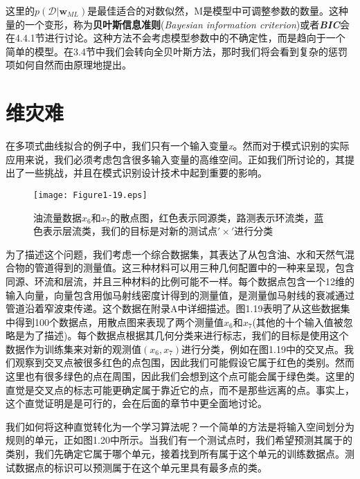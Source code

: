 	这里的$p(\mathcal{D}| \textbf{w}_{ML})$是最佳适合的对数似然，M是模型中可调整参数的数量。这种量的一个变形，称为\textbf{贝叶斯信息准则}(\textit{Bayesian information criterion})或者\textit{\textbf{BIC}}会在4.4.1节进行讨论。这种方法不会考虑模型参数中的不确定性，而是趋向于一个简单的模型。在3.4节中我们会转向全贝叶斯方法，那时我们将会看到复杂的惩罚项如何自然而由原理地提出。
	
\section{维灾难}
	在多项式曲线拟合的例子中，我们只有一个输入变量\textit{x}。然而对于模式识别的实际应用来说，我们必须考虑包含很多输入变量的高维空间。正如我们所讨论的，其提出了一些挑战，并且在模式识别设计技术中起到重要的影响。
	
	\begin{figure}[t]
		\parbox{.4\textwidth}{\caption{ 油流量数据$x_6$和$x_7$的散点图，红色表示同源类，路测表示环流类，蓝色表示层流类，我们的目标是对新的测试点$'\times'$进行分类 }}
		\parbox{.5\textwidth}{\texttt{[image: Figure1-19.eps]}}
	\end{figure}
	
	为了描述这个问题，我们考虑一个综合数据集，其表达了从包含油、水和天然气混合物的管道得到的测量值。这三种材料可以用三种几何配置中的一种来呈现，包含同源、环流和层流，并且三种材料的比例可能不一样。每个数据点包含一个12维的输入向量，向量包含用伽马射线密度计得到的测量值，是测量伽马射线的衰减通过管道沿着窄波束传递。这个数据在附录A中详细描述。图1.19表明了从这些数据集中得到100个数据点，用散点图来表现了两个测量值$x_6$和$x_7$(其他的十个输入值被忽略是为了描述)。每个数据点根据其几何分类来进行标志，我们的目标是使用这个数据作为训练集来对新的观测值$(x_6, x_7)$进行分类，例如在图1.19中的交叉点。我们观察到交叉点被很多红色的点包围，因此我们可能假设它属于红色的类别。然而这里也有很多绿色的点在周围，因此我们会想到这个点可能会属于绿色类。这里的直觉是交叉点的标志可能更确定属于靠近它的点，而不是那些远离的点。事实上，这个直觉证明是是可行的，会在后面的章节中更全面地讨论。
	
	我们如何将这种直觉转化为一个学习算法呢？一个简单的方法是将输入空间划分为规则的单元，正如图1.20中所示。当我们有一个测试点时，我们希望预测其属于的类别，我们先确定它属于哪个单元，接着找到所有属于这个单元的训练数据点。测试数据点的标识可以预测属于在这个单元里具有最多点的类。
	
	
	
	